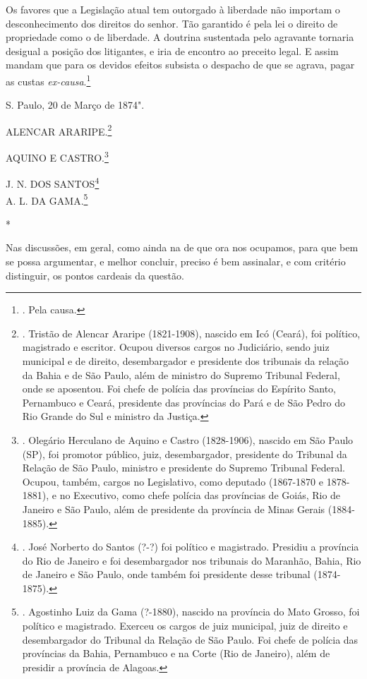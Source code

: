Os favores que a Legislação atual tem outorgado à liberdade não importam
o desconhecimento dos direitos do senhor. Tão garantido é pela lei o
direito de propriedade como o de liberdade. A doutrina sustentada pelo
agravante tornaria desigual a posição dos litigantes, e iria de encontro
ao preceito legal. E assim mandam que para os devidos efeitos subsista o
despacho de que se agrava, pagar as custas \emph{ex-causa}.\footnote{.
  Pela causa.}

S. Paulo, 20 de Março de 1874".

ALENCAR ARARIPE.\footnote{. Tristão de Alencar Araripe (1821-1908),
  nascido em Icó (Ceará), foi político, magistrado e escritor. Ocupou
  diversos cargos no Judiciário, sendo juiz municipal e de direito,
  desembargador e presidente dos tribunais da relação da Bahia e de São
  Paulo, além de ministro do Supremo Tribunal Federal, onde se
  aposentou. Foi chefe de polícia das províncias do Espírito Santo,
  Pernambuco e Ceará, presidente das províncias do Pará e de São Pedro
  do Rio Grande do Sul e ministro da Justiça.}

AQUINO E CASTRO.\footnote{. Olegário Herculano de Aquino e Castro
  (1828-1906), nascido em São Paulo (SP), foi promotor público, juiz,
  desembargador, presidente do Tribunal da Relação de São Paulo,
  ministro e presidente do Supremo Tribunal Federal. Ocupou, também,
  cargos no Legislativo, como deputado (1867-1870 e 1878-1881), e no
  Executivo, como chefe polícia das províncias de Goiás, Rio de Janeiro
  e São Paulo, além de presidente da província de Minas Gerais
  (1884-1885).}

J. N. DOS SANTOS\footnote{. José Norberto do Santos (?-?) foi político e
  magistrado. Presidiu a província do Rio de Janeiro e foi desembargador
  nos tribunais do Maranhão, Bahia, Rio de Janeiro e São Paulo, onde
  também foi presidente desse tribunal (1874-1875).}\\
A. L. DA GAMA.\footnote{. Agostinho Luiz da Gama (?-1880), nascido na
  província do Mato Grosso, foi político e magistrado. Exerceu os cargos
  de juiz municipal, juiz de direito e desembargador do Tribunal da
  Relação de São Paulo. Foi chefe de polícia das províncias da Bahia,
  Pernambuco e na Corte (Rio de Janeiro), além de presidir a província
  de Alagoas.}

*

Nas discussões, em geral, como ainda na de que ora nos ocupamos, para
que bem se possa argumentar, e melhor concluir, preciso é bem assinalar,
e com critério distinguir, os pontos cardeais da questão.

